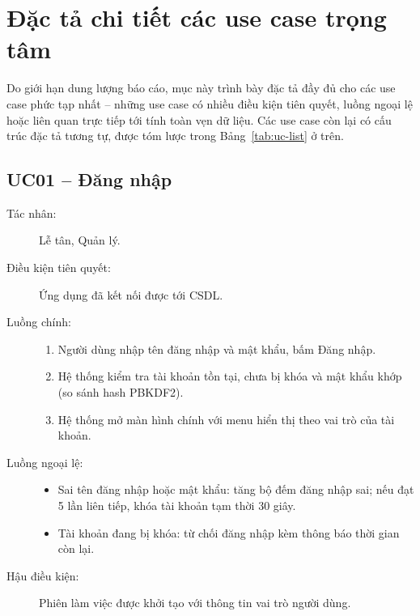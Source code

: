 \documentclass[14pt]{report}
\begin{document}
\section{Đặc tả chi tiết các use case trọng tâm}

Do giới hạn dung lượng báo cáo, mục này trình bày đặc tả đầy đủ cho các use case phức tạp nhất -- những use case có nhiều điều kiện tiên quyết, luồng ngoại lệ hoặc liên quan trực tiếp tới tính toàn vẹn dữ liệu. Các use case còn lại có cấu trúc đặc tả tương tự, được tóm lược trong Bảng~\ref{tab:uc-list} ở trên.

\subsection{UC01 -- Đăng nhập}
\begin{description}
  \item[Tác nhân:] Lễ tân, Quản lý.
  \item[Điều kiện tiên quyết:] Ứng dụng đã kết nối được tới CSDL.
  \item[Luồng chính:] 
  \begin{enumerate}
    \item Người dùng nhập tên đăng nhập và mật khẩu, bấm Đăng nhập.
    \item Hệ thống kiểm tra tài khoản tồn tại, chưa bị khóa và mật khẩu khớp (so sánh hash PBKDF2).
    \item Hệ thống mở màn hình chính với menu hiển thị theo vai trò của tài khoản.
  \end{enumerate}
  \item[Luồng ngoại lệ:]
  \begin{itemize}
    \item Sai tên đăng nhập hoặc mật khẩu: tăng bộ đếm đăng nhập sai; nếu đạt 5 lần liên tiếp, khóa tài khoản tạm thời 30 giây.
    \item Tài khoản đang bị khóa: từ chối đăng nhập kèm thông báo thời gian còn lại.
  \end{itemize}
  \item[Hậu điều kiện:] Phiên làm việc được khởi tạo với thông tin vai trò người dùng.
\end{description}
\end{document}
